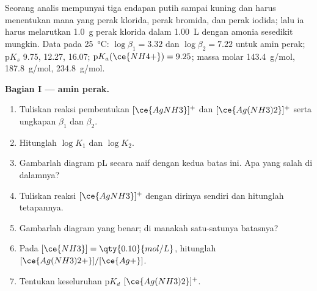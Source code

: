 \begin{problem}
\label{pb:b1:complexation:1}
Seorang analis mempunyai tiga endapan putih sampai kuning dan harus
menentukan mana yang perak klorida, perak bromida, dan perak iodida;
lalu ia harus melarutkan \qty{1.0}{g} perak klorida dalam \qty{1.00}{L}
dengan amonia sesedikit mungkin. Data pada \qty{25}{\celsius}:
$\log\beta_1 = 3.32$ dan $\log\beta_2 = 7.22$ untuk  amin perak;
$\mathrm{p}K_s$  9.75,  12.27,  16.07;
$\mathrm{p}K_a(\ce{NH4+}) = 9.25$; massa molar 
\qty{143.4}{g/mol},  \qty{187.8}{g/mol}, 
\qty{234.8}{g/mol}.

\medskip
\noindent\textbf{Bagian I ---  amin perak.}
\begin{enumerate}
  \item Tuliskan reaksi pembentukan $[\ce{AgNH3}]^{+}$ dan
        $[\ce{Ag(NH3)2}]^{+}$ serta ungkapan $\beta_1$ dan $\beta_2$.
  \item Hitunglah $\log K_1$ dan $\log K_2$.
  \item Gambarlah diagram pL secara naif dengan kedua batas ini. Apa yang
        salah di dalamnya?
  \item Tuliskan reaksi $[\ce{AgNH3}]^{+}$ dengan dirinya sendiri dan
        hitunglah tetapannya.
  \item Gambarlah diagram yang benar; di manakah satu-satunya batasnya?
  \item Pada $[\ce{NH3}] = \qty{0.10}{mol/L}$, hitunglah
        $[\ce{Ag(NH3)2+}]/[\ce{Ag+}]$.
  \item Tentukan  keseluruhan $\mathrm{p}K_d$
        $[\ce{Ag(NH3)2}]^{+}$.
\end{enumerate}


\end{problem}
